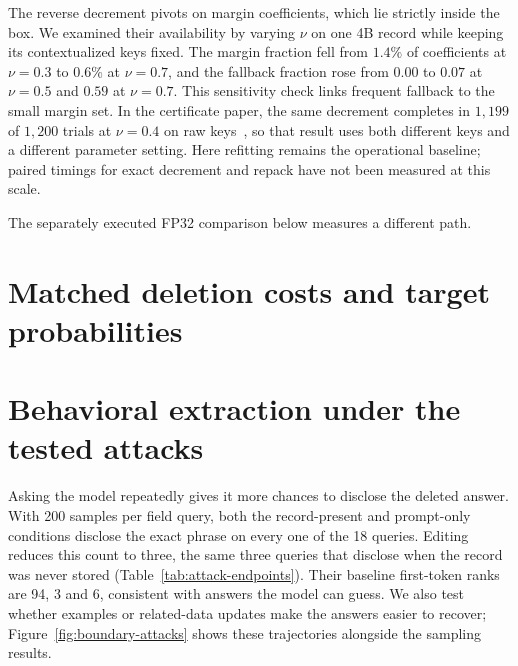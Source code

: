 The reverse decrement pivots on margin coefficients, which lie strictly
inside the box. We examined their availability by varying \(\nu\) on one
4B record while keeping its contextualized keys fixed. The margin fraction
fell from \(1.4\%\) of coefficients at \(\nu=0.3\) to \(0.6\%\) at
\(\nu=0.7\), and the fallback fraction rose from \(0.00\) to \(0.07\) at
\(\nu=0.5\) and \(0.59\) at \(\nu=0.7\). This sensitivity check links
frequent fallback to the small margin set. In the certificate paper, the
same decrement completes in \(1{,}199\) of \(1{,}200\) trials at
\(\nu=0.4\) on raw keys~\citep{svattn}, so that result uses both different
keys and a different parameter setting. Here refitting remains the
operational baseline; paired timings for exact decrement and repack have
not been measured at this scale.

The separately executed FP32 comparison below measures a different path.

\section{Matched deletion costs and target probabilities}\label{sec:cost-utility}

\FloatBarrier

\section{Behavioral extraction under the tested attacks}\label{sec:attacks}

Asking the model repeatedly gives it more chances to disclose the deleted
answer. With 200 samples per field query, both the record-present and
prompt-only conditions disclose the exact phrase on every one of the
18 queries. Editing reduces this count to three, the same three queries
that disclose when the record was never stored
(Table~\ref{tab:attack-endpoints}). Their baseline first-token ranks are
94, 3 and 6, consistent with answers the model can guess. We also test
whether examples or related-data updates make the answers easier to recover;
Figure~\ref{fig:boundary-attacks} shows these trajectories alongside the
sampling results.

